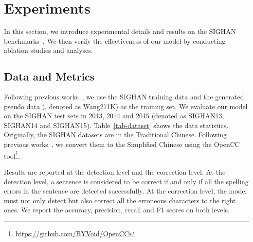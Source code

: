 \documentclass[11pt,a4paper]{article}
\begin{document}
\section{Experiments}



In this section, we introduce experimental details and results on the SIGHAN benchmarks~\citep{sighan13,sighan14, sighan15}.
We then verify the effectiveness of our model by conducting ablation studies and analyses.





\subsection{Data and Metrics}

Following previous works~\citep{pointer-spell, spellgcn}, we use the SIGHAN training data and the generated pseudo data (\citealp{spell-corpus}, denoted as Wang271K) as the training set. We evaluate our model on the SIGHAN test sets in 2013, 2014 and 2015 (denoted as SIGHAN13, SIGHAN14 and SIGHAN15). Table~\ref{tab-dataset} shows the data statistics. Originally, the SIGHAN datasets are in the Traditional Chinese.
Following previous works~\citep{pointer-spell, spellgcn,softmask-spell}, we convert them to the Simplified Chinese using the OpenCC  tool\footnote{\url{https://github.com/BYVoid/OpenCC}}. 




Results are reported at the detection level and the correction level.
At the detection level, a sentence is considered to be correct if and only if all the spelling errors in the sentence are detected successfully. 
At the correction level, the model must not only detect but also correct all the erroneous characters to the right ones.
We report the accuracy, precision, recall and F1 scores on both levels.
\end{document}
